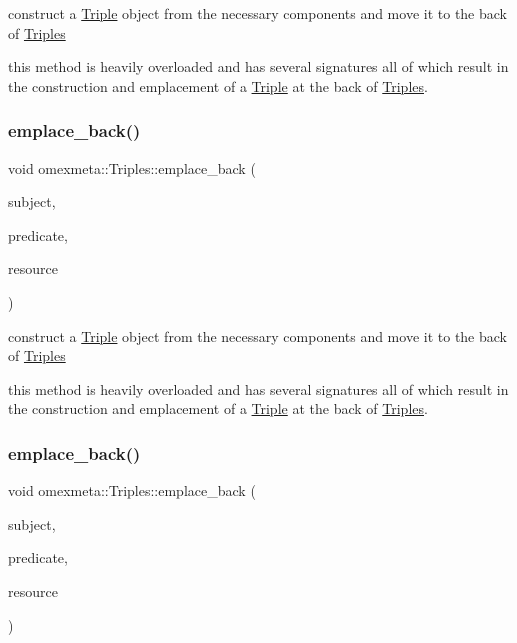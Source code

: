 construct a \hyperlink{classomexmeta_1_1Triple}{Triple} object from the necessary components and move it to the back of \hyperlink{classomexmeta_1_1Triples}{Triples} 

this method is heavily overloaded and has several signatures all of which result in the construction and emplacement of a \hyperlink{classomexmeta_1_1Triple}{Triple} at the back of \hyperlink{classomexmeta_1_1Triples}{Triples}. \mbox{\label{classomexmeta_1_1Triples_a55e7ed1c3212ae19d2189a386b81422e}} 
\subsubsection{\texorpdfstring{emplace\+\_\+back()}{emplace\_back()}\hspace{0.1cm}{\footnotesize\ttfamily [6/7]}}
{\footnotesize\ttfamily void omexmeta\+::\+Triples\+::emplace\+\_\+back (\begin{DoxyParamCaption}\item[{\hyperlink{classomexmeta_1_1Subject}{Subject}}]{subject,  }\item[{\hyperlink{classomexmeta_1_1SemSim}{Sem\+Sim}}]{predicate,  }\item[{const \hyperlink{classomexmeta_1_1Resource}{Resource} \&}]{resource }\end{DoxyParamCaption})}



construct a \hyperlink{classomexmeta_1_1Triple}{Triple} object from the necessary components and move it to the back of \hyperlink{classomexmeta_1_1Triples}{Triples} 

this method is heavily overloaded and has several signatures all of which result in the construction and emplacement of a \hyperlink{classomexmeta_1_1Triple}{Triple} at the back of \hyperlink{classomexmeta_1_1Triples}{Triples}. \mbox{\label{classomexmeta_1_1Triples_a3a8c150cff4d1e78aa360d62d3d6604e}} 
\subsubsection{\texorpdfstring{emplace\+\_\+back()}{emplace\_back()}\hspace{0.1cm}{\footnotesize\ttfamily [7/7]}}
{\footnotesize\ttfamily void omexmeta\+::\+Triples\+::emplace\+\_\+back (\begin{DoxyParamCaption}\item[{librdf\+\_\+node $\ast$}]{subject,  }\item[{librdf\+\_\+node $\ast$}]{predicate,  }\item[{librdf\+\_\+node $\ast$}]{resource }\end{DoxyParamCaption})}



